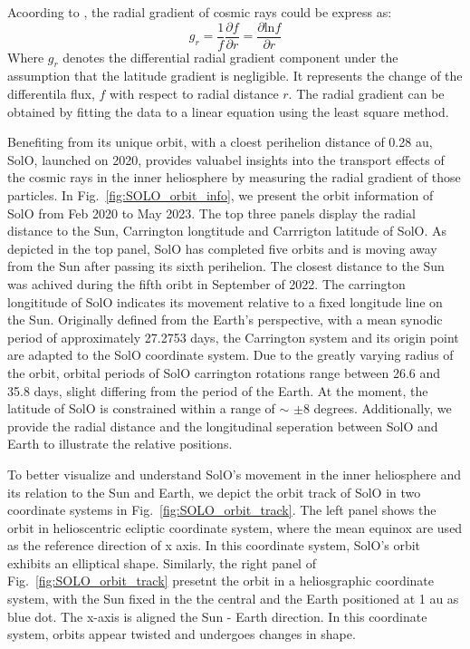 Acoording to \citet{Rankin2021ApJ}, the radial gradient of cosmic rays could be express as:
\begin{equation}
    g_r = \frac{1}{f}\frac{\partial{f}}{\partial{r}} = \frac{\partial{\mathrm{ln} f}}{\partial{r}}
    \label{eq:radial_gradient}
\end{equation}
Where $g_r$ denotes the differential radial gradient component under the assumption that the latitude gradient is negligible. It represents the change of the differentila flux, $f$ with respect to radial distance $r$. The radial gradient can be obtained by fitting the data to a linear equation using the least square method.


Benefiting from its unique orbit, with a cloest perihelion distance of 0.28 au, \ac{SolO}, launched on 2020, provides valuabel insights into the transport effects of the cosmic rays in the inner heliosphere by measuring the radial gradient of those particles.
In Fig.~\ref{fig:SOLO_orbit_info}, we present the orbit information of \ac{SolO} from Feb 2020 to May 2023. The top three panels display the radial distance to the Sun, Carrington longtitude and Carrrigton latitude of \ac{SolO}. As depicted in the top panel, \ac{SolO} has completed five orbits and is moving away from the Sun after passing its sixth perihelion. The closest distance to the Sun was achived during the fifth oribt in September of 2022. 
The carrington longititude of \ac{SolO} indicates its movement relative to a fixed longitude line on the Sun. Originally defined from the Earth's perspective, with a mean synodic period of approximately 27.2753 days, the Carrington system and its origin point are adapted to the \ac{SolO} coordinate system. 
Due to the greatly varying radius of the orbit, orbital periods of \ac{SolO} carrington rotations range between 26.6 and 35.8 days, slight differing from the period of the Earth. At the moment, the latitude of \ac{SolO} is constrained within a range of $\sim$ $\pm$8 degrees.
Additionally, we provide the radial distance and the longitudinal seperation between \ac{SolO} and Earth to illustrate the relative positions.

To better visualize and understand \ac{SolO}'s movement in the inner heliosphere and its relation to the Sun and Earth, we depict the orbit track of \ac{SolO} in two coordinate systems in Fig.~\ref{fig:SOLO_orbit_track}. The left panel shows the orbit in helioscentric ecliptic coordinate system, where the mean equinox are used as the reference direction of x axis. In this coordinate system, \ac{SolO}'s orbit exhibits an elliptical shape. Similarly, the right panel of Fig.~\ref{fig:SOLO_orbit_track} presetnt the orbit in a heliosgraphic coordinate system, with the Sun fixed in the the central and the Earth positioned at 1 au as blue dot. The x-axis is aligned the Sun - Earth direction. In this coordinate system, orbits appear twisted and undergoes changes in shape.

